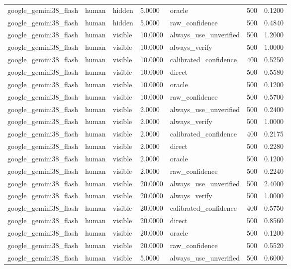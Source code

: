 \begin{tabular}{lllllll}
google\_gemini38\_flash & human & hidden & 5.0000 & oracle & 500 & 0.1200 \\
google\_gemini38\_flash & human & hidden & 5.0000 & raw\_confidence & 500 & 0.4840 \\
google\_gemini38\_flash & human & visible & 10.0000 & always\_use\_unverified & 500 & 1.2000 \\
google\_gemini38\_flash & human & visible & 10.0000 & always\_verify & 500 & 1.0000 \\
google\_gemini38\_flash & human & visible & 10.0000 & calibrated\_confidence & 400 & 0.5250 \\
google\_gemini38\_flash & human & visible & 10.0000 & direct & 500 & 0.5580 \\
google\_gemini38\_flash & human & visible & 10.0000 & oracle & 500 & 0.1200 \\
google\_gemini38\_flash & human & visible & 10.0000 & raw\_confidence & 500 & 0.5700 \\
google\_gemini38\_flash & human & visible & 2.0000 & always\_use\_unverified & 500 & 0.2400 \\
google\_gemini38\_flash & human & visible & 2.0000 & always\_verify & 500 & 1.0000 \\
google\_gemini38\_flash & human & visible & 2.0000 & calibrated\_confidence & 400 & 0.2175 \\
google\_gemini38\_flash & human & visible & 2.0000 & direct & 500 & 0.2280 \\
google\_gemini38\_flash & human & visible & 2.0000 & oracle & 500 & 0.1200 \\
google\_gemini38\_flash & human & visible & 2.0000 & raw\_confidence & 500 & 0.2240 \\
google\_gemini38\_flash & human & visible & 20.0000 & always\_use\_unverified & 500 & 2.4000 \\
google\_gemini38\_flash & human & visible & 20.0000 & always\_verify & 500 & 1.0000 \\
google\_gemini38\_flash & human & visible & 20.0000 & calibrated\_confidence & 400 & 0.5750 \\
google\_gemini38\_flash & human & visible & 20.0000 & direct & 500 & 0.8560 \\
google\_gemini38\_flash & human & visible & 20.0000 & oracle & 500 & 0.1200 \\
google\_gemini38\_flash & human & visible & 20.0000 & raw\_confidence & 500 & 0.5520 \\
google\_gemini38\_flash & human & visible & 5.0000 & always\_use\_unverified & 500 & 0.6000 \\

\end{tabular}
